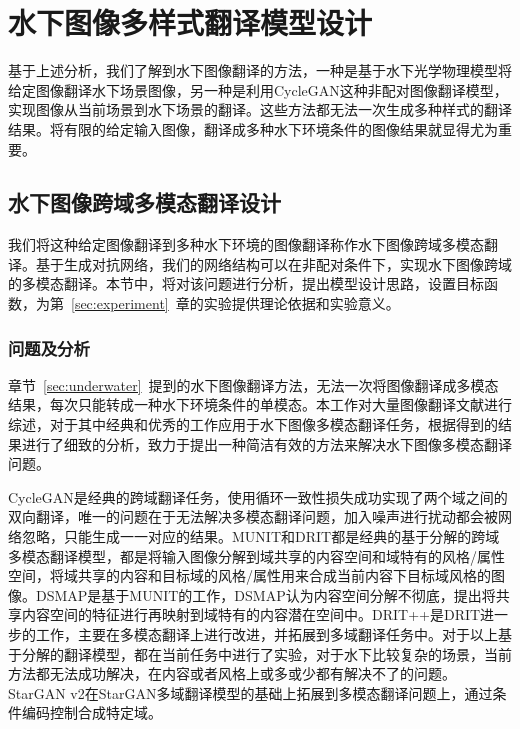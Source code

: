 \chapter{水下图像多样式翻译模型设计}
基于上述分析，我们了解到水下图像翻译的方法，一种是基于水下光学物理模型将给定图像翻译水下场景图像，另一种是利用CycleGAN这种非配对图像翻译模型，实现图像从当前场景到水下场景的翻译。这些方法都无法一次生成多种样式的翻译结果。将有限的给定输入图像，翻译成多种水下环境条件的图像结果就显得尤为重要。%

\section{水下图像跨域多模态翻译设计}
我们将这种给定图像翻译到多种水下环境的图像翻译称作水下图像跨域多模态翻译。基于生成对抗网络，我们的网络结构可以在非配对条件下，实现水下图像跨域的多模态翻译。本节中，将对该问题进行分析，提出模型设计思路，设置目标函数，为第~\ref{sec:experiment}~章的实验提供理论依据和实验意义。

\subsection{问题及分析}
章节~\ref{sec:underwater}~提到的水下图像翻译方法，无法一次将图像翻译成多模态结果，每次只能转成一种水下环境条件的单模态。本工作对大量图像翻译文献进行综述，对于其中经典和优秀的工作应用于水下图像多模态翻译任务，根据得到的结果进行了细致的分析，致力于提出一种简洁有效的方法来解决水下图像多模态翻译问题。

CycleGAN是经典的跨域翻译任务，使用循环一致性损失成功实现了两个域之间的双向翻译，唯一的问题在于无法解决多模态翻译问题，加入噪声进行扰动都会被网络忽略，只能生成一一对应的结果。MUNIT和DRIT都是经典的基于分解的跨域多模态翻译模型，都是将输入图像分解到域共享的内容空间和域特有的风格/属性空间，将域共享的内容和目标域的风格/属性用来合成当前内容下目标域风格的图像。DSMAP是基于MUNIT的工作，DSMAP认为内容空间分解不彻底，提出将共享内容空间的特征进行再映射到域特有的内容潜在空间中。DRIT++是DRIT进一步的工作，主要在多模态翻译上进行改进，并拓展到多域翻译任务中。对于以上基于分解的翻译模型，都在当前任务中进行了实验，对于水下比较复杂的场景，当前方法都无法成功解决，在内容或者风格上或多或少都有解决不了的问题。StarGAN v2在StarGAN多域翻译模型的基础上拓展到多模态翻译问题上，通过条件编码控制合成特定域。

